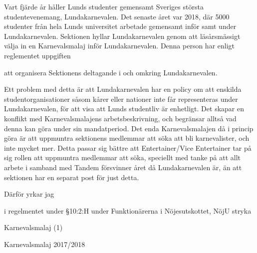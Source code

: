 \documentclass[../_main/handlingar.tex]{subfiles}
\begin{document}

Vart fjärde år håller Lunds studenter gemensamt Sveriges största studentevenemang, Lundakarnevalen. 
Det senaste året var 2018, där 5000 studenter från hela Lunds universitet arbetade gemensamt inför samt under Lundakarnevalen. 
Sektionen hyllar Lundakarnevalen genom att läsårsmässigt välja in en Karnevalsmalaj inför Lundakarnevalen. 
Denna person har enligt reglementet uppgiften 
\begin{dashlist}
    \item att organisera Sektionens deltagande i och omkring Lundakarnevalen.
\end{dashlist}

Ett problem med detta är att Lundakarnevalen har en policy om att enskilda studentorganisationer såsom kårer eller nationer inte får representeras under Lundakarnevalen, för att visa att Lunds studentliv är enhetligt.
Det skapar en konflikt med Karnevalsmalajens arbetsbeskrivning, och begränsar alltså vad denna kan göra under sin mandatperiod. Det enda Karnevalsmalajen då i princip göra är att uppmuntra sektionens medlemmar att söka att bli karnevalister, och inte mycket mer.
Detta passar sig bättre att Entertainer/Vice Entertainer tar på sig rollen att uppmuntra medlemmar att söka, speciellt med tanke på att allt arbete i samband med Tandem försvinner året då Lundakarnevalen är, än att sektionen har en separat post för just detta.


Därför yrkar jag 
\begin{attsatser}

    \att i regelmentet under \S10:2:H under Funktionärerna i Nöjesutskottet, NöjU stryka \par
    \begin{emptylist}
        \item Karnevalsmalaj (1)
    \end{emptylist}

\end{attsatser}


\begin{signatures}{1}
    \isekt
    \signature{Filip Larsson}{Karnevalsmalaj 2017/2018}
\end{signatures}
\end{document}

